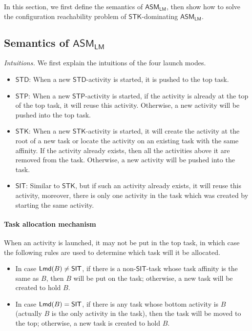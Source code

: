 \documentclass[preprint,12pt]{elsarticle}
\newcommand\Mm{{\mathcal{M} }}
\newcommand\lmd{{\sf Lmd}}
\newcommand{\LMAMASS}{\textsf{ASM}_\textsf{LM}}
\newcommand{\STK}{\mathsf{STK}}
\newcommand{\SIT}{\mathsf{SIT}}
\newcommand{\STD}{\mathsf{STD}}
\newcommand{\STP}{\mathsf{STP}}
\begin{document}
In this section, we first define the semantics of $\LMAMASS$, then show how to solve the configuration reachability problem of $\STK$-dominating $\LMAMASS$. 



\subsection{Semantics of $\LMAMASS$} \label{sect:semlmamass}



%
\noindent\emph{Intuitions.}  We first explain the intuitions of the four launch modes. 

\begin{itemize}
	\item  $\STD$: When a new $\STD$-activity is started, it is pushed to the top task. 
	\item $\STP$: When a new $\STP$-activity is started, if the activity is already at the top of the top task, it will reuse this activity. Otherwise, a new activity will be pushed into the top task.
	\item $\STK$: When a new $\STK$-activity is started, it will create the activity at the root of a new task or locate the activity on an existing task with the same affinity. If the activity already exists, then all the activities above it are removed from the task. Otherwise, a new activity will be pushed into the task.
	\item $\SIT$: 
	Similar to $\STK$, but if such an activity already exists, it will reuse this activity, moreover, there is only one activity in the task which was created by starting the same activity.
\end{itemize}




\paragraph*{Task allocation mechanism}
When an activity is launched, it may not be put in the top task, in which case  
the following rules are used to determine which task will it be allocated. 
\begin{itemize}
	\item In case $\lmd(B) \neq \SIT$, if there is a non-$\SIT$-task whose task affinity is the same as $B$, then $B$ will be put on the task; otherwise, a new task will be created to hold $B$.
	
	\item In case $\lmd(B) = \SIT$,    if there is any task whose bottom activity is $B$ (actually $B$ is the only activity in the task), then the task will be moved to the top; otherwise, a new task is created to hold $B$.
\end{itemize}
\end{document}
